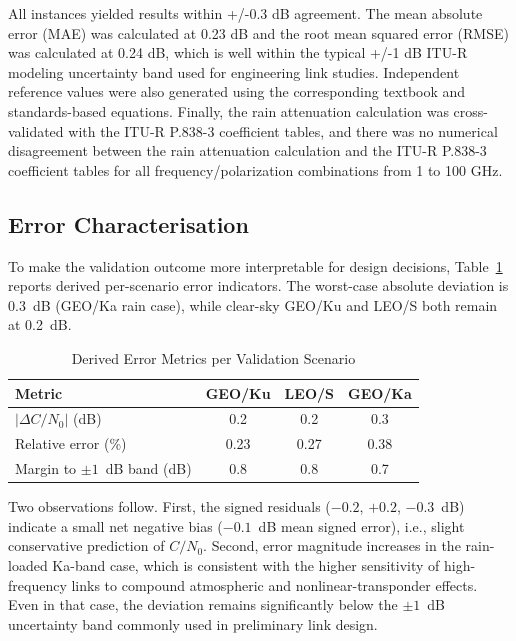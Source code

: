 \documentclass[conference]{IEEEtran}
\begin{document}
All instances yielded results within +/-0.3 dB agreement. The mean absolute error (MAE) was calculated at 0.23 dB and the root mean squared error (RMSE) was calculated at 0.24 dB, which is well within the typical +/-1 dB ITU-R modeling uncertainty band used for engineering link studies. Independent reference values were also generated using the corresponding textbook and standards-based equations. Finally, the rain attenuation calculation was cross-validated with the ITU-R P.838-3 coefficient tables, and there was no numerical disagreement between the rain attenuation calculation and the ITU-R P.838-3 coefficient tables for all frequency/polarization combinations from 1 to 100 GHz.

\subsection{Error Characterisation}

To make the validation outcome more interpretable for design decisions,
Table~\ref{tab:error_metrics} reports derived per-scenario error indicators.
The worst-case absolute deviation is 0.3~dB (GEO/Ka rain case), while
clear-sky GEO/Ku and LEO/S both remain at 0.2~dB.

\begin{table}[!t]
\caption{Derived Error Metrics per Validation Scenario}
\label{tab:error_metrics}
\centering
\begin{tabular}{@{}lccc@{}}
\toprule
\textbf{Metric} & \textbf{GEO/Ku} & \textbf{LEO/S} & \textbf{GEO/Ka} \\
\midrule
$|\Delta C/N_0|$ (dB)      & 0.2  & 0.2  & 0.3 \\
Relative error (\%)        & 0.23 & 0.27 & 0.38 \\
Margin to $\pm1$~dB band (dB) & 0.8  & 0.8  & 0.7 \\
\bottomrule
\end{tabular}
\end{table}

Two observations follow. First, the signed residuals
($-0.2$, $+0.2$, $-0.3$~dB) indicate a small net negative bias
($-0.1$~dB mean signed error), i.e., slight conservative prediction of
$C/N_0$. Second, error magnitude increases in the rain-loaded Ka-band case,
which is consistent with the higher sensitivity of high-frequency links to
compound atmospheric and nonlinear-transponder effects. Even in that case,
the deviation remains significantly below the \mbox{$\pm1$~dB} uncertainty
band commonly used in preliminary link design.
\end{document}

